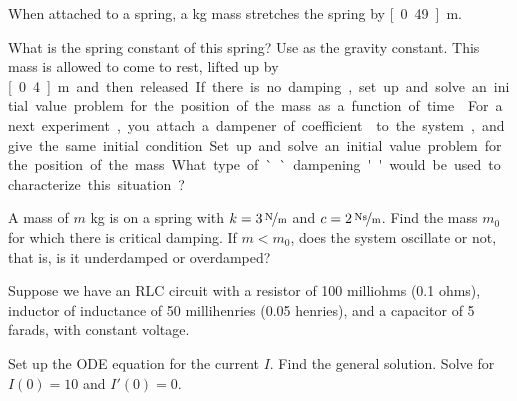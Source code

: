 \documentclass{ximera}
\begin{document}
\begin{exercise}
    When attached to a spring, a \unit[2]{kg} mass stretches the spring by \unit[0.49]{m}. 
    \begin{tasks}
        \task What is the spring constant of this spring? Use  as the gravity constant.  
        \task This mass is allowed to come to rest, lifted up by \unit[0.4]{m} and then released. If there is no damping, set up and solve an initial value problem for the position of the mass as a function of time.
        \task For a next experiment, you attach a dampener of coefficient  to the system, and give the same initial condition. Set up and solve an initial value problem for the position of the mass. What type of ``dampening'' would be used to characterize this situation?
    \end{tasks}
\end{exercise}

\begin{exercise}%
    A mass of $m$ \unit{kg} is on a spring with $k=\unitfrac[3]{N}{m}$ and $c=\unitfrac[2]{Ns}{m}$.  Find the mass $m_0$ for which there is critical damping.  If $m < m_0$, does the system oscillate or not, that is, is it underdamped or overdamped?
\end{exercise}

\begin{exercise}%
    Suppose we have an RLC circuit with a resistor of 100 milliohms (0.1 ohms), inductor of inductance of 50 millihenries (0.05 henries), and a capacitor of 5 farads, with constant voltage.
    \begin{tasks}
        \task Set up the ODE equation for the current $I$.
        \task Find the general solution.
        \task Solve for $I(0) = 10$ and $I'(0) = 0$.
    \end{tasks}
\end{exercise}
\end{document}
